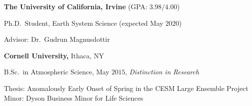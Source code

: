 \documentclass[margin,line,palatino,courier,10pt]{res}
\newenvironment{list1}{
  \begin{list}{\ding{113}}{%
      \setlength{\itemsep}{0in}
      \setlength{\parsep}{0in} \setlength{\parskip}{0in}
      \setlength{\topsep}{0in} \setlength{\partopsep}{0in}
      \setlength{\leftmargin}{0.17in}}}{\end{list}}
\begin{document}
\begin{resume}
{\bf The University of California, Irvine} (GPA: $3.98/4.00$)\\
\vspace*{-.12in}
\begin{list1}
\item[] Ph.D.~Student, Earth System Science (expected May $2020$)

\hspace*{0.2in} Advisor: Dr.\ Gudrun Magnusdottir
\end{list1}

{\bf Cornell University,} Ithaca, NY\\
\vspace*{-.12in}
\begin{list1}
\item[] B.Sc.~in Atmospheric Science, May $2015$, \textit{Distinction in Research}

\hspace{0.2in}  Thesis: Anomalously Early Onset of Spring in the CESM Large Ensemble Project\\
\hspace*{0.2in}  Minor: Dyson Business Minor for Life Sciences

\end{list1}


\end{resume}
\end{document}
